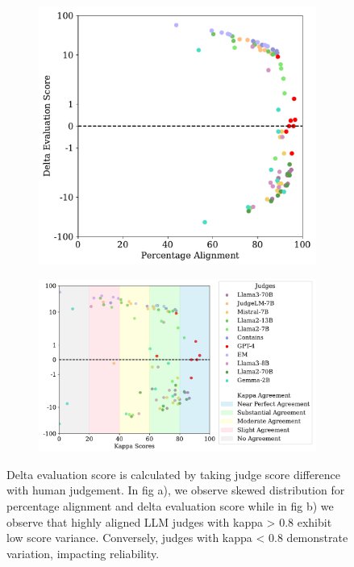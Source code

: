 \begin{figure}[h]
    \centering
    \begin{subfigure}[b]{0.4\textwidth}
        \centering
        \includegraphics[width=\linewidth]{figures/KappaScoreVariation_V5_a.pdf}
        \caption{}
        \label{fig:cohenskappa_part1}
    \end{subfigure}%
    \begin{subfigure}[b]{0.6\textwidth}
        \centering
        \includegraphics[width=\linewidth]{figures/KappaScoreVariation_V5_b.pdf}
        \caption{}
        \label{fig:cohenskappa_part2}
    \end{subfigure}
    \caption{Delta evaluation score is calculated by taking judge score difference with human judgement. In fig a), we observe skewed distribution for percentage alignment and delta evaluation score while in fig b) we observe that highly aligned LLM judges with kappa > 0.8 exhibit low score variance. Conversely, judges with kappa < 0.8 demonstrate variation, impacting reliability. }
    \label{fig:cohenskappa}
\end{figure}

